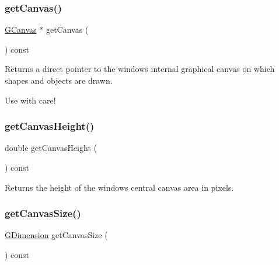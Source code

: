 \mbox{\label{classsgl_1_1GWindow_a7aed3237105aa56033642252b3b1445e}} 
\subsubsection{\texorpdfstring{get\+Canvas()}{getCanvas()}}
{\footnotesize\ttfamily \mbox{\hyperlink{classsgl_1_1GCanvas}{G\+Canvas}} $\ast$ get\+Canvas (\begin{DoxyParamCaption}{ }\end{DoxyParamCaption}) const\hspace{0.3cm}{\ttfamily [virtual]}}



Returns a direct pointer to the window\textquotesingle{}s internal graphical canvas on which shapes and objects are drawn. 

Use with care! \mbox{\label{classsgl_1_1GWindow_abd8bb28e2ac85d1b474db3f17f65115e}} 
\subsubsection{\texorpdfstring{get\+Canvas\+Height()}{getCanvasHeight()}}
{\footnotesize\ttfamily double get\+Canvas\+Height (\begin{DoxyParamCaption}{ }\end{DoxyParamCaption}) const\hspace{0.3cm}{\ttfamily [virtual]}}



Returns the height of the window\textquotesingle{}s central canvas area in pixels. 

\mbox{\label{classsgl_1_1GWindow_a7d095192cefa2d9acf8fcf1cd00386c4}} 
\subsubsection{\texorpdfstring{get\+Canvas\+Size()}{getCanvasSize()}}
{\footnotesize\ttfamily \mbox{\hyperlink{structsgl_1_1GDimension}{G\+Dimension}} get\+Canvas\+Size (\begin{DoxyParamCaption}{ }\end{DoxyParamCaption}) const\hspace{0.3cm}{\ttfamily [virtual]}}



